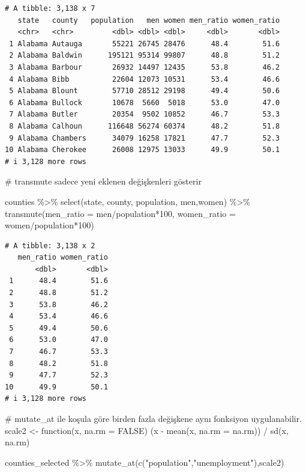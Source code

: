 \documentclass[
  letterpaper,
  DIV=11,
  numbers=noendperiod]{scrreprt}
\newenvironment{Shaded}{\begin{snugshade}}{\end{snugshade}}
\newcommand{\AttributeTok}[1]{\textcolor[rgb]{0.40,0.45,0.13}{#1}}
\newcommand{\CommentTok}[1]{\textcolor[rgb]{0.37,0.37,0.37}{#1}}
\newcommand{\ConstantTok}[1]{\textcolor[rgb]{0.56,0.35,0.01}{#1}}
\newcommand{\ControlFlowTok}[1]{\textcolor[rgb]{0.00,0.23,0.31}{#1}}
\newcommand{\DecValTok}[1]{\textcolor[rgb]{0.68,0.00,0.00}{#1}}
\newcommand{\FunctionTok}[1]{\textcolor[rgb]{0.28,0.35,0.67}{#1}}
\newcommand{\NormalTok}[1]{\textcolor[rgb]{0.00,0.23,0.31}{#1}}
\newcommand{\OtherTok}[1]{\textcolor[rgb]{0.00,0.23,0.31}{#1}}
\newcommand{\SpecialCharTok}[1]{\textcolor[rgb]{0.37,0.37,0.37}{#1}}
\newcommand{\StringTok}[1]{\textcolor[rgb]{0.13,0.47,0.30}{#1}}
\begin{document}
\begin{verbatim}
# A tibble: 3,138 x 7
   state   county   population   men women men_ratio women_ratio
   <chr>   <chr>         <dbl> <dbl> <dbl>     <dbl>       <dbl>
 1 Alabama Autauga       55221 26745 28476      48.4        51.6
 2 Alabama Baldwin      195121 95314 99807      48.8        51.2
 3 Alabama Barbour       26932 14497 12435      53.8        46.2
 4 Alabama Bibb          22604 12073 10531      53.4        46.6
 5 Alabama Blount        57710 28512 29198      49.4        50.6
 6 Alabama Bullock       10678  5660  5018      53.0        47.0
 7 Alabama Butler        20354  9502 10852      46.7        53.3
 8 Alabama Calhoun      116648 56274 60374      48.2        51.8
 9 Alabama Chambers      34079 16258 17821      47.7        52.3
10 Alabama Cherokee      26008 12975 13033      49.9        50.1
# i 3,128 more rows
\end{verbatim}

\begin{Shaded}
\begin{Highlighting}[]
\CommentTok{\# transmute sadece yeni eklenen değişkenleri gösterir}

\NormalTok{counties }\SpecialCharTok{\%\textgreater{}\%}
  \FunctionTok{select}\NormalTok{(state, county, population, men,women) }\SpecialCharTok{\%\textgreater{}\%} 
\FunctionTok{transmute}\NormalTok{(}\AttributeTok{men\_ratio =}\NormalTok{ men}\SpecialCharTok{/}\NormalTok{population}\SpecialCharTok{*}\DecValTok{100}\NormalTok{,}
       \AttributeTok{women\_ratio =}\NormalTok{ women}\SpecialCharTok{/}\NormalTok{population}\SpecialCharTok{*}\DecValTok{100}\NormalTok{)}
\end{Highlighting}
\end{Shaded}

\begin{verbatim}
# A tibble: 3,138 x 2
   men_ratio women_ratio
       <dbl>       <dbl>
 1      48.4        51.6
 2      48.8        51.2
 3      53.8        46.2
 4      53.4        46.6
 5      49.4        50.6
 6      53.0        47.0
 7      46.7        53.3
 8      48.2        51.8
 9      47.7        52.3
10      49.9        50.1
# i 3,128 more rows
\end{verbatim}

\begin{Shaded}
\begin{Highlighting}[]
\CommentTok{\# mutate\_at ile koşula göre birden fazla değişkene aynı fonksiyon uygulanabilir.}
\NormalTok{scale2 }\OtherTok{\textless{}{-}} \ControlFlowTok{function}\NormalTok{(x, }\AttributeTok{na.rm =} \ConstantTok{FALSE}\NormalTok{) (x }\SpecialCharTok{{-}} \FunctionTok{mean}\NormalTok{(x, }\AttributeTok{na.rm =}\NormalTok{ na.rm)) }\SpecialCharTok{/} \FunctionTok{sd}\NormalTok{(x, na.rm)}

\NormalTok{counties\_selected }\SpecialCharTok{\%\textgreater{}\%} 
  \FunctionTok{mutate\_at}\NormalTok{(}\FunctionTok{c}\NormalTok{(}\StringTok{"population"}\NormalTok{,}\StringTok{"unemployment"}\NormalTok{),scale2)}
\end{Highlighting}
\end{Shaded}
\end{document}
